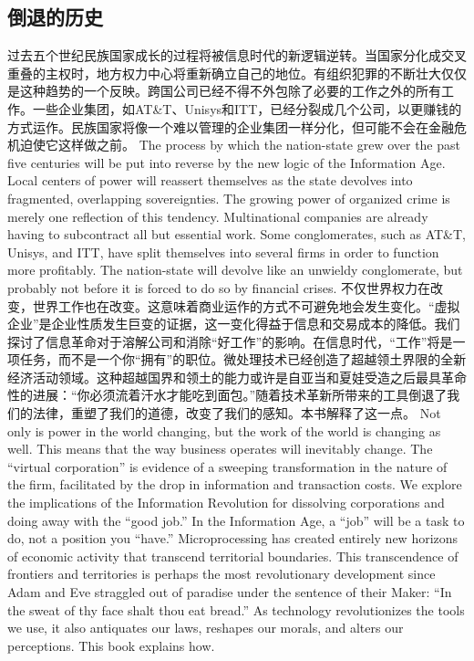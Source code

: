 \subsection{倒退的历史}
\begin{paracol}{2}[]
过去五个世纪民族国家成长的过程将被信息时代的新逻辑逆转。当国家分化成交叉重叠的主权时，地方权力中心将重新确立自己的地位。有组织犯罪的不断壮大仅仅是这种趋势的一个反映。跨国公司已经不得不外包除了必要的工作之外的所有工作。一些企业集团，如AT\&T、Unisys和ITT，已经分裂成几个公司，以更赚钱的方式运作。民族国家将像一个难以管理的企业集团一样分化，但可能不会在金融危机迫使它这样做之前。
\switchcolumn
The process by which the nation-state grew over the past five centuries will be put into reverse by the new logic of the Information Age. Local centers of power will reassert themselves as the state devolves into fragmented, overlapping sovereignties. The growing power of organized crime is merely one reflection of this tendency. Multinational companies are already having to subcontract all but essential work. Some conglomerates, such as AT\&T, Unisys, and ITT, have split themselves into several firms in order to function more profitably. The nation-state will devolve like an unwieldy conglomerate, but probably not before it is forced to do so by financial crises.
\switchcolumn*
不仅世界权力在改变，世界工作也在改变。这意味着商业运作的方式不可避免地会发生变化。“虚拟企业”是企业性质发生巨变的证据，这一变化得益于信息和交易成本的降低。我们探讨了信息革命对于溶解公司和消除“好工作”的影响。在信息时代，“工作”将是一项任务，而不是一个你“拥有”的职位。微处理技术已经创造了超越领土界限的全新经济活动领域。这种超越国界和领土的能力或许是自亚当和夏娃受造之后最具革命性的进展：“你必须流着汗水才能吃到面包。”随着技术革新所带来的工具倒退了我们的法律，重塑了我们的道德，改变了我们的感知。本书解释了这一点。
\switchcolumn
Not only is power in the world changing, but the work of the world is changing as well. This means that the way business operates will inevitably change. The ``virtual corporation'' is evidence of a sweeping transformation in the nature of the firm, facilitated by the drop in information and transaction costs. We explore the implications of the Information Revolution for dissolving corporations and doing away with the ``good job.'' In the Information Age, a ``job'' will be a task to do, not a position you ``have.'' Microprocessing has created entirely new horizons of economic activity that transcend territorial boundaries. This transcendence of frontiers and territories is perhaps the most revolutionary development since Adam and Eve straggled out of paradise under the sentence of their Maker: ``In the sweat of thy face shalt thou eat bread.'' As technology revolutionizes the tools we use, it also antiquates our laws, reshapes our morals, and alters our perceptions. This book explains how.

\end{paracol}
